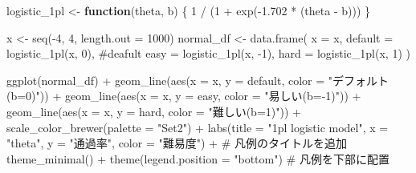 \documentclass[
  a4paper,
]{ltjsbook}
\newenvironment{Shaded}{\begin{snugshade}}{\end{snugshade}}
\newcommand{\AttributeTok}[1]{\textcolor[rgb]{0.40,0.45,0.13}{#1}}
\newcommand{\CommentTok}[1]{\textcolor[rgb]{0.37,0.37,0.37}{#1}}
\newcommand{\ControlFlowTok}[1]{\textcolor[rgb]{0.00,0.23,0.31}{\textbf{#1}}}
\newcommand{\DecValTok}[1]{\textcolor[rgb]{0.68,0.00,0.00}{#1}}
\newcommand{\FloatTok}[1]{\textcolor[rgb]{0.68,0.00,0.00}{#1}}
\newcommand{\FunctionTok}[1]{\textcolor[rgb]{0.28,0.35,0.67}{#1}}
\newcommand{\NormalTok}[1]{\textcolor[rgb]{0.00,0.23,0.31}{#1}}
\newcommand{\OtherTok}[1]{\textcolor[rgb]{0.00,0.23,0.31}{#1}}
\newcommand{\SpecialCharTok}[1]{\textcolor[rgb]{0.37,0.37,0.37}{#1}}
\newcommand{\StringTok}[1]{\textcolor[rgb]{0.13,0.47,0.30}{#1}}
\begin{document}
\begin{Shaded}
\begin{Highlighting}[]
\NormalTok{logistic\_1pl }\OtherTok{\textless{}{-}} \ControlFlowTok{function}\NormalTok{(theta, b) \{}
  \DecValTok{1} \SpecialCharTok{/}\NormalTok{ (}\DecValTok{1} \SpecialCharTok{+} \FunctionTok{exp}\NormalTok{(}\SpecialCharTok{{-}}\FloatTok{1.702} \SpecialCharTok{*}\NormalTok{ (theta }\SpecialCharTok{{-}}\NormalTok{ b)))}
\NormalTok{\}}

\NormalTok{x }\OtherTok{\textless{}{-}} \FunctionTok{seq}\NormalTok{(}\SpecialCharTok{{-}}\DecValTok{4}\NormalTok{, }\DecValTok{4}\NormalTok{, }\AttributeTok{length.out =} \DecValTok{1000}\NormalTok{)}
\NormalTok{normal\_df }\OtherTok{\textless{}{-}} \FunctionTok{data.frame}\NormalTok{(}
  \AttributeTok{x =}\NormalTok{ x,}
  \AttributeTok{default =} \FunctionTok{logistic\_1pl}\NormalTok{(x, }\DecValTok{0}\NormalTok{), }\CommentTok{\#deafult}
  \AttributeTok{easy =} \FunctionTok{logistic\_1pl}\NormalTok{(x, }\SpecialCharTok{{-}}\DecValTok{1}\NormalTok{),}
  \AttributeTok{hard =} \FunctionTok{logistic\_1pl}\NormalTok{(x, }\DecValTok{1}\NormalTok{)}
\NormalTok{)}

\FunctionTok{ggplot}\NormalTok{(normal\_df) }\SpecialCharTok{+}
  \FunctionTok{geom\_line}\NormalTok{(}\FunctionTok{aes}\NormalTok{(}\AttributeTok{x =}\NormalTok{ x, }\AttributeTok{y =}\NormalTok{ default, }\AttributeTok{color =} \StringTok{"デフォルト(b=0)"}\NormalTok{)) }\SpecialCharTok{+}
  \FunctionTok{geom\_line}\NormalTok{(}\FunctionTok{aes}\NormalTok{(}\AttributeTok{x =}\NormalTok{ x, }\AttributeTok{y =}\NormalTok{ easy, }\AttributeTok{color =} \StringTok{"易しい(b={-}1)"}\NormalTok{)) }\SpecialCharTok{+}
  \FunctionTok{geom\_line}\NormalTok{(}\FunctionTok{aes}\NormalTok{(}\AttributeTok{x =}\NormalTok{ x, }\AttributeTok{y =}\NormalTok{ hard, }\AttributeTok{color =} \StringTok{"難しい(b=1)"}\NormalTok{)) }\SpecialCharTok{+}
  \FunctionTok{scale\_color\_brewer}\NormalTok{(}\AttributeTok{palette =} \StringTok{"Set2"}\NormalTok{) }\SpecialCharTok{+} 
  \FunctionTok{labs}\NormalTok{(}\AttributeTok{title =} \StringTok{"1pl logistic model"}\NormalTok{,}
       \AttributeTok{x =} \StringTok{"theta"}\NormalTok{,}
       \AttributeTok{y =} \StringTok{"通過率"}\NormalTok{,}
       \AttributeTok{color =} \StringTok{"難易度"}\NormalTok{) }\SpecialCharTok{+}  \CommentTok{\# 凡例のタイトルを追加}
  \FunctionTok{theme\_minimal}\NormalTok{() }\SpecialCharTok{+}
  \FunctionTok{theme}\NormalTok{(}\AttributeTok{legend.position =} \StringTok{"bottom"}\NormalTok{)  }\CommentTok{\# 凡例を下部に配置}
\end{Highlighting}
\end{Shaded}
\end{document}
